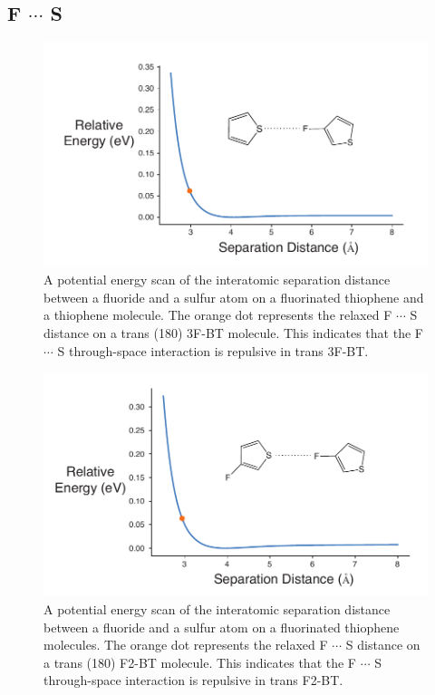 \subsection{\texorpdfstring{F $\cdots$ S}{FS}}
\begin{figure}[hbt!]
    \centering
    \includegraphics{figures/append_aroma/ts_t_t_f1_copy.pdf}
    \caption{A potential energy scan of the interatomic separation distance between a fluoride and a sulfur atom on a fluorinated thiophene and a thiophene molecule. The orange dot represents the relaxed F $\cdots$ S distance on a trans (180\textdegree) 3F-BT molecule. This indicates that the F $\cdots$ S through-space interaction is repulsive in trans 3F-BT.}
    \label{fig:ts_t_t_f1}
\end{figure}

\begin{figure}[hbt!]
    \centering
    \includegraphics{figures/append_aroma/ts_2t_f1_copy.pdf}
    \caption{A potential energy scan of the interatomic separation distance between a fluoride and a sulfur atom on a fluorinated thiophene molecules. The orange dot represents the relaxed F $\cdots$ S distance on a trans (180\textdegree) F2-BT molecule. This indicates that the F $\cdots$ S through-space interaction is repulsive in trans F2-BT.}
    \label{fig:ts_2t_f1}
\end{figure}
\clearpage

